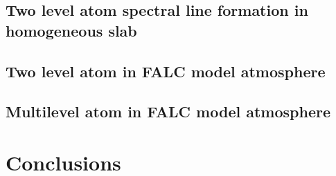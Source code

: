 \documentclass[referee]{aa}
\begin{document}
\subsection{Two level atom spectral line formation in homogeneous slab}

\subsection{Two level atom in FALC model atmosphere}

\subsection{Multilevel atom in FALC model atmosphere}

\section{Conclusions}

 



\end{document}
